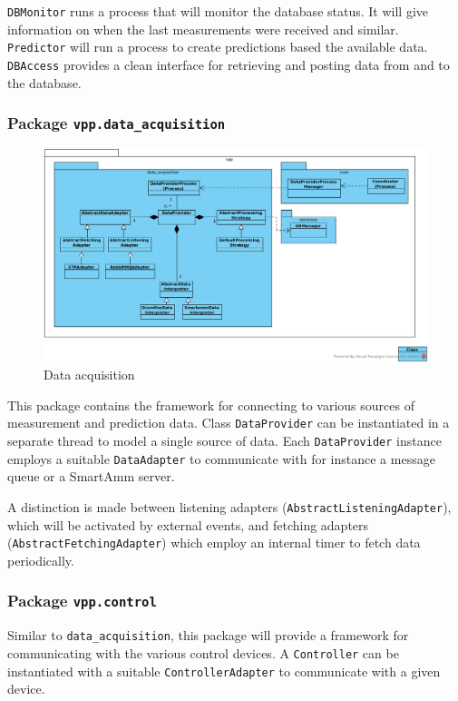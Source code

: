 \texttt{DBMonitor} runs a process that will monitor the database status. It will give information on when the last measurements were received and similar.\\

\texttt{Predictor} will run a process to create predictions based the available data.\\

\texttt{DBAccess} provides a clean interface for retrieving and posting data from and to the database. 

\subsubsection{Package \texttt{vpp.data\_acquisition}}

\begin{figure}[H]
    \centering
    \includegraphics[width=\textwidth]{figures/class_data_acquisition}
    \caption{Data acquisition}
    \label{figureClassDiagram}
\end{figure}

This package contains the framework for connecting to various sources of measurement and prediction data. Class \texttt{DataProvider} can be instantiated in a separate thread to model a single source of data. Each \texttt{DataProvider} instance employs a suitable \texttt{DataAdapter} to communicate with for instance a message queue or a SmartAmm server.

A distinction is made between listening adapters (\texttt{AbstractListeningAdapter}), which will be activated by external events, and fetching adapters (\texttt{AbstractFetchingAdapter}) which employ an internal timer to fetch data periodically.

\subsubsection{Package \texttt{vpp.control}}
Similar to \texttt{data\_acquisition}, this package will provide a framework for communicating with the various control devices. A \texttt{Controller} can be instantiated with a suitable \texttt{ControllerAdapter} to communicate with a given device. 


